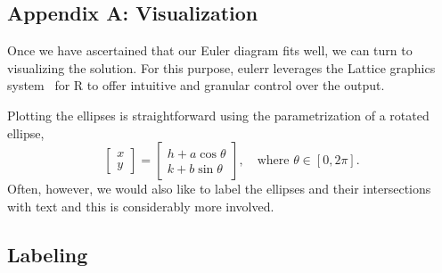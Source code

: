 \documentclass[
  a4paper,
  nofonts,
  nobib,
  nohyper,
  openany
]{tufte-book}\usepackage[]{graphicx}\usepackage[]{color}
\newcommand{\pkg}[1]{{\fontseries{b}\selectfont #1}}
\begin{document}
\begin{appendices}
\chapter{Appendix A: Visualization}

Once we have ascertained that our Euler diagram fits well, we can turn to visualizing the solution. For this purpose, \pkg{eulerr} leverages the \pkg{Lattice} graphics system~\citep{sarkar_2008} for R to offer intuitive and granular control over the output.

Plotting the ellipses is straightforward using the parametrization of a rotated ellipse,
%
\begin{equation*}
\begin{bmatrix}
  x \\ y
\end{bmatrix} =
\begin{bmatrix}
  h + a \cos{\theta} \\
  k + b \sin{\theta}
\end{bmatrix},\quad \text{where } \theta \in [0, 2\pi].
\end{equation*}
%
Often, however, we would also like to label the ellipses and their intersections with text and this is considerably more involved.

\section{Labeling}
\label{sec:labeling}


\end{appendices}
\end{document}
